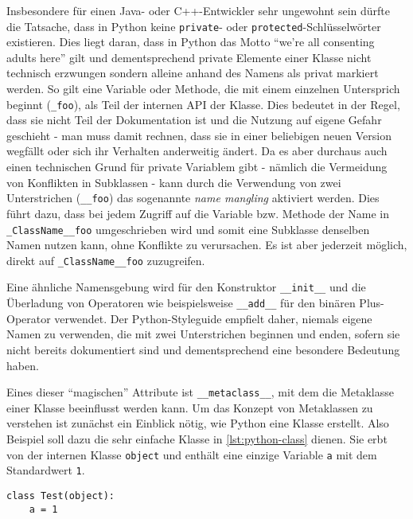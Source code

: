 Insbesondere für einen Java- oder C++-Entwickler sehr ungewohnt sein dürfte die Tatsache, dass in
Python keine \lstinline{private}- oder \lstinline{protected}-Schlüsselwörter existieren. Dies liegt
daran, dass in Python das Motto \enquote{we're all consenting adults here} \citep{pymail:adults}
gilt und dementsprechend private Elemente einer Klasse nicht technisch erzwungen sondern alleine
anhand des Namens als privat markiert werden. So gilt eine Variable oder Methode, die mit einem
einzelnen Untersprich beginnt (\lstinline{_foo}), als Teil der internen API der Klasse. Dies
bedeutet in der Regel, dass sie nicht Teil der Dokumentation ist und die Nutzung auf eigene Gefahr
geschieht - man muss damit rechnen, dass sie in einer beliebigen neuen Version wegfällt oder sich
ihr Verhalten anderweitig ändert. Da es aber durchaus auch einen technischen Grund für private
Variablem gibt - nämlich die Vermeidung von Konflikten in Subklassen - kann durch die Verwendung von
zwei Unterstrichen (\lstinline{__foo}) das sogenannte \emph{name mangling} aktiviert werden. Dies
führt dazu, dass bei jedem Zugriff auf die Variable bzw. Methode der Name in
\lstinline{_ClassName__foo} umgeschrieben wird und somit eine Subklasse denselben Namen nutzen kann,
ohne Konflikte zu verursachen. Es ist aber jederzeit möglich, direkt auf \lstinline{_ClassName__foo}
zuzugreifen.

Eine ähnliche Namensgebung wird für den Konstruktor \lstinline{__init__} und die Überladung von
Operatoren wie beispielsweise \lstinline{__add__} für den binären Plus-Operator verwendet. Der
Python-Styleguide empfielt daher, niemals eigene Namen zu verwenden, die mit zwei Unterstrichen
beginnen und enden, sofern sie nicht bereits dokumentiert sind und dementsprechend eine besondere
Bedeutung haben.

Eines dieser \enquote{magischen} Attribute ist \lstinline{__metaclass__}, mit dem die Metaklasse
einer Klasse beeinflusst werden kann. Um das Konzept von Metaklassen zu verstehen ist zunächst ein
Einblick nötig, wie Python eine Klasse erstellt. Also Beispiel soll dazu die sehr einfache Klasse in
\autoref{lst:python-class} dienen. Sie erbt von der internen Klasse \lstinline{object} und enthält
eine einzige Variable \lstinline{a} mit dem Standardwert \lstinline{1}.

\begin{lstlisting}[caption=Python-Klassendefinition,label=lst:python-class]
class Test(object):
    a = 1
\end{lstlisting}

